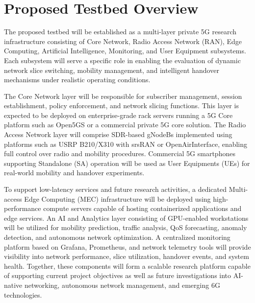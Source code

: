 \documentclass[12pt,a4paper]{article}
\begin{document}
\section{Proposed Testbed Overview}
The proposed testbed will be established as a multi-layer private 5G research infrastructure consisting of Core Network, Radio Access Network (RAN), Edge Computing, Artificial Intelligence, Monitoring, and User Equipment subsystems. Each subsystem will serve a specific role in enabling the evaluation of dynamic network slice switching, mobility management, and intelligent handover mechanisms under realistic operating conditions.

The Core Network layer will be responsible for subscriber management, session establishment, policy enforcement, and network slicing functions. This layer is expected to be deployed on enterprise-grade rack servers running a 5G Core platform such as Open5GS or a commercial private 5G core solution. The Radio Access Network layer will comprise SDR-based gNodeBs implemented using platforms such as USRP B210/X310 with srsRAN or OpenAirInterface, enabling full control over radio and mobility procedures. Commercial 5G smartphones supporting Standalone (SA) operation will be used as User Equipments (UEs) for real-world mobility and handover experiments.

To support low-latency services and future research activities, a dedicated Multi-access Edge Computing (MEC) infrastructure will be deployed using high-performance compute servers capable of hosting containerized applications and edge services. An AI and Analytics layer consisting of GPU-enabled workstations will be utilized for mobility prediction, traffic analysis, QoS forecasting, anomaly detection, and autonomous network optimization. A centralized monitoring platform based on Grafana, Prometheus, and network telemetry tools will provide visibility into network performance, slice utilization, handover events, and system health. Together, these components will form a scalable research platform capable of supporting current project objectives as well as future investigations into AI-native networking, autonomous network management, and emerging 6G technologies.
\end{document}
